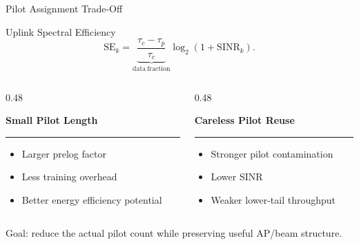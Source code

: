 \documentclass[aspectratio=169, 10pt]{beamer}
\newcommand{\slideheading}[1]{%
    \par\vspace{0.08cm}%
    \settowidth{\dimen0}{\bfseries\large #1}%
    {\bfseries\large #1}%
    \par\vspace{0.015cm}%
    {\color{black}\rule{\dimen0}{0.7pt}}%
    \par\vspace{0.16cm}%
}
\begin{document}
\begin{frame}{Pilot Assignment Trade-Off}
    \begin{block}{Uplink Spectral Efficiency}
        \[
            \mathrm{SE}_k =
            \underbrace{\frac{\tau_c-\tau_p}{\tau_c}}_{\mathrm{data\ fraction}}
            \log_2(1+\mathrm{SINR}_k).
        \]
    \end{block}

    \vspace{0.25cm}
    \begin{columns}[T,onlytextwidth]
        \begin{column}{0.48\textwidth}
            \slideheading{Small Pilot Length}
            \begin{itemize}
                \item Larger prelog factor
                \item Less training overhead
                \item Better energy efficiency potential
            \end{itemize}
        \end{column}
        \begin{column}{0.48\textwidth}
            \slideheading{Careless Pilot Reuse}
            \begin{itemize}
                \item Stronger pilot contamination
                \item Lower SINR
                \item Weaker lower-tail throughput
            \end{itemize}
        \end{column}
    \end{columns}

    \vspace{0.25cm}
    \alert{Goal: reduce the actual pilot count while preserving useful AP/beam structure.}
\end{frame}

\end{document}
